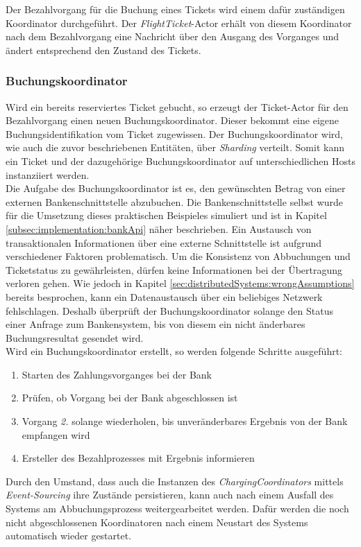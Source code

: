 Der Bezahlvorgang für die Buchung eines Tickets wird einem dafür zuständigen Koordinator durchgeführt. Der \textit{FlightTicket}-Actor erhält von diesem Koordinator nach dem Bezahlvorgang eine Nachricht über den Ausgang des Vorganges und ändert entsprechend den Zustand des Tickets.

\subsubsection{Buchungskoordinator}
\label{subsub:implementation:ChargingCoordinator}
Wird ein bereits reserviertes Ticket gebucht, so erzeugt der Ticket-Actor für den Bezahlvorgang einen neuen Buchungskoordinator. Dieser bekommt eine eigene Buchungsidentifikation vom Ticket zugewissen. Der Buchungskoordinator wird, wie auch die zuvor beschriebenen Entitäten, über \textit{Sharding} verteilt. Somit kann ein Ticket und der dazugehörige Buchungskoordinator auf unterschiedlichen Hosts instanziiert werden. \\
Die Aufgabe des Buchungskoordinator ist es, den gewünschten Betrag von einer externen Bankenschnittstelle abzubuchen. Die Bankenschnittstelle selbst wurde für die Umsetzung dieses praktischen Beispieles simuliert und ist in Kapitel \ref{subsec:implementation:bankApi} näher beschrieben. Ein Austausch von transaktionalen Informationen über eine externe Schnittstelle ist aufgrund verschiedener Faktoren problematisch. Um die Konsistenz von Abbuchungen und Ticketstatus zu gewährleisten, dürfen keine Informationen bei der Übertragung verloren gehen. Wie jedoch in Kapitel \ref{sec:distributedSystems:wrongAssumptions} bereits besprochen, kann ein Datenaustausch über ein beliebiges Netzwerk fehlschlagen. Deshalb überprüft der Buchungskoordinator solange den Status einer Anfrage zum Bankensystem, bis von diesem ein nicht änderbares Buchungsresultat gesendet wird. \\
Wird ein Buchungskoordinator erstellt, so werden folgende Schritte ausgeführt:
\begin{enumerate}
  \item Starten des Zahlungsvorganges bei der Bank
  \item Prüfen, ob Vorgang bei der Bank abgeschlossen ist
  \item Vorgang \textit{2.} solange wiederholen, bis unveränderbares Ergebnis von der Bank empfangen wird
  \item Ersteller des Bezahlprozesses mit Ergebnis informieren
\end{enumerate}
Durch den Umstand, dass auch die Instanzen des \textit{ChargingCoordinators} mittels \textit{Event-Sourcing} ihre Zustände persistieren, kann auch nach einem Ausfall des Systems am Abbuchungsprozess weitergearbeitet werden. Dafür werden die noch nicht abgeschlossenen Koordinatoren nach einem Neustart des Systems automatisch wieder gestartet. \\
